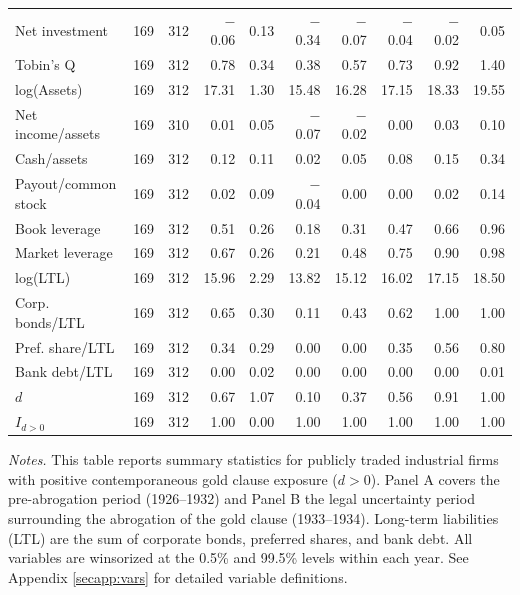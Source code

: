 \begin{table}[p]
\begin{threeparttable}
\begin{tabular}{lrrrrrrrrr}
            \midrule
            Net investment & 169 & 312 & $-$0.06 & 0.13 & $-$0.34 & $-$0.07 & $-$0.04 & $-$0.02 & 0.05 \\
            Tobin's Q & 169 & 312 & 0.78 & 0.34 & 0.38 & 0.57 & 0.73 & 0.92 & 1.40 \\
            log(Assets) & 169 & 312 & 17.31 & 1.30 & 15.48 & 16.28 & 17.15 & 18.33 & 19.55 \\
            Net income/assets & 169 & 310 & 0.01 & 0.05 & $-$0.07 & $-$0.02 & 0.00 & 0.03 & 0.10 \\
            Cash/assets & 169 & 312 & 0.12 & 0.11 & 0.02 & 0.05 & 0.08 & 0.15 & 0.34 \\
            Payout/common stock & 169 & 312 & 0.02 & 0.09 & $-$0.04 & 0.00 & 0.00 & 0.02 & 0.14 \\
            Book leverage & 169 & 312 & 0.51 & 0.26 & 0.18 & 0.31 & 0.47 & 0.66 & 0.96 \\
            Market leverage & 169 & 312 & 0.67 & 0.26 & 0.21 & 0.48 & 0.75 & 0.90 & 0.98 \\
            log(LTL) & 169 & 312 & 15.96 & 2.29 & 13.82 & 15.12 & 16.02 & 17.15 & 18.50 \\
            Corp. bonds/LTL & 169 & 312 & 0.65 & 0.30 & 0.11 & 0.43 & 0.62 & 1.00 & 1.00 \\
            Pref. share/LTL & 169 & 312 & 0.34 & 0.29 & 0.00 & 0.00 & 0.35 & 0.56 & 0.80 \\
            Bank debt/LTL & 169 & 312 & 0.00 & 0.02 & 0.00 & 0.00 & 0.00 & 0.00 & 0.01 \\
            \ensuremath{d} & 169 & 312 & 0.67 & 1.07 & 0.10 & 0.37 & 0.56 & 0.91 & 1.00 \\
            \ensuremath{I_{d>0}} & 169 & 312 & 1.00 & 0.00 & 1.00 & 1.00 & 1.00 & 1.00 & 1.00 \\
            \bottomrule
        \end{tabular}
    \end{threeparttable}

    \vspace*{3mm} \justifying \noindent
\scriptsize{\textit{Notes.} This table reports summary statistics for publicly traded industrial firms with positive contemporaneous gold clause exposure ($d > 0$). Panel A covers the pre-abrogation period (1926--1932) and Panel B the legal uncertainty period surrounding the abrogation of the gold clause (1933--1934). Long-term liabilities (LTL) are the sum of corporate bonds, preferred shares, and bank debt. All variables are winsorized at the 0.5\% and 99.5\% levels within each year. See Appendix \ref{secapp:vars} for detailed variable definitions.}
\end{table}